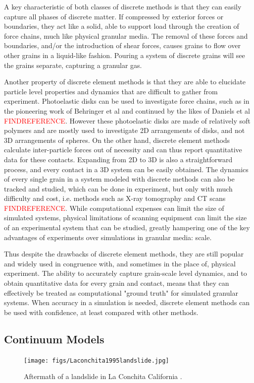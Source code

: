 A key characteristic of both classes of discrete methods is that they can easily capture all phases of discrete matter. If compressed by exterior forces or boundaries, they act like a solid, able to support load through the creation of force chains, much like physical granular media. The removal of these forces and boundaries, and/or the introduction of shear forces, causes grains to flow over other grains in a liquid-like fashion. Pouring a system of discrete grains will see the grains separate, capturing a granular gas.

Another property of discrete element methods is that they are able to elucidate particle level properties and dynamics that are difficult to gather from experiment. Photoelastic disks can be used to investigate force chains, such as in the pioneering work of Behringer et al and continued by the likes of Daniels et al \textcolor{red}{FINDREFERENCE}. However these photoelastic disks are made of relatively soft polymers and are mostly used to investigate 2D arrangements of disks, and not 3D arrangements of spheres. On the other hand, discrete element methods calculate inter-particle forces out of necessity and can thus report quantitative data for these contacts. Expanding from 2D to 3D is also a straightforward process, and every contact in a 3D system can be easily obtained. The dynamics of every single grain in a system modeled with discrete methods can also be tracked and studied, which can be done in experiment, but only with much difficulty and cost, i.e. methods such as X-ray tomography and CT scans \textcolor{red}{FINDREFERENCE}. While computational expenses can limit the size of simulated systems, physical limitations of scanning equipment can limit the size of an experimental system that can be studied, greatly hampering one of the key advantages of experiments over simulations in granular media: scale. 

Thus despite the drawbacks of discrete element methods, they are still popular and widely used in congruence with, and sometimes in the place of, physical experiment. The ability to accurately capture grain-scale level dynamics, and to obtain quantitative data for every grain and contact, means that they can effectively be treated as computational "ground truth" for simulated granular systems. When accuracy in a simulation is needed, discrete element methods can be used with confidence, at least compared with other methods.

\subsection{Continuum Models}
\begin{figure}[htp] 
    \centering
    \texttt{[image: figs/Laconchita1995landslide.jpg]}
    \caption{Aftermath of a landslide in La Conchita California \cite{Laconchita}.}
    \label{landslide}
\end{figure}

